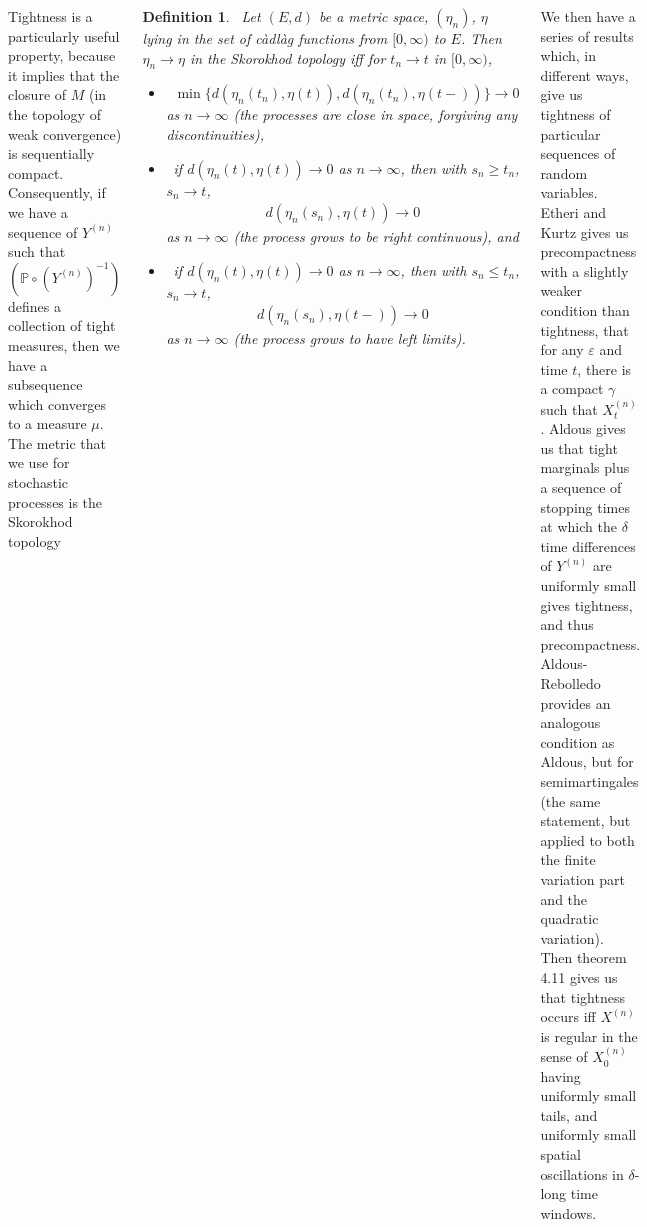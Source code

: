 \documentclass{tikzposter} %
\newcommand\Pj{\mathbb{P}}
\newcommand\rightopen[2]{\ensuremath{[#1,#2)}}
\newtheorem{definition}{Definition}
\begin{document}
\begin{columns}
{    Tightness is a particularly useful property, because it implies that the closure of $M$ (in the topology of weak convergence) is sequentially compact. Consequently, if we have a sequence of $Y^{(n)}$ such that $(\Pj \circ (Y^{(n)})^{-1})$ defines a collection of tight measures, then we have a subsequence which converges to a measure $\mu$. \\

    The metric that we use for stochastic processes is the Skorokhod topology
    \begin{definition}
    \ Let $(E, d)$ be a metric space, $(\eta_n)$, $\eta$ lying in the set of c\`adl\`ag functions from $\rightopen{0}{\infty}$ to $E$. Then $\eta_n \to \eta$ in the Skorokhod topology iff for $t_n \to t$ in $\rightopen{0}{\infty}$,
    \begin{itemize}[label=$\cdot$]
    \item \ $\min \{d(\eta_n(t_n), \eta(t)), d(\eta_n(t_n), \eta(t-))\} \to 0$ as $n \to \infty$ (the processes are close in space, forgiving any discontinuities),
    \item \ if $d(\eta_n(t), \eta(t)) \to 0$ as $n \to \infty$, then with $s_n \ge t_n$, $s_n \to t$,
    \begin{align*}
    d(\eta_n(s_n), \eta(t)) \to 0
    \end{align*}
    as $n \to \infty$ (the process grows to be right continuous), and
    \item \ if $d(\eta_n(t), \eta(t)) \to 0$ as $n \to \infty$, then with $s_n \le t_n$, $s_n \to t$,
    \begin{align*}
    d(\eta_n(s_n), \eta(t-)) \to 0
    \end{align*}
    as $n \to \infty$ (the process grows to have left limits).
    \end{itemize}
    \end{definition}
    \hphantom{}

    We then have a series of results which, in different ways, give us tightness of particular sequences of random variables. \\

    Etheri and Kurtz gives us precompactness with a slightly weaker condition than tightness, that for any $\varepsilon$ and time $t$, there is a compact $\gamma$ such that $X^{(n)}_t$. Aldous gives us that tight marginals plus a sequence of stopping times at which the $\delta$ time differences of $Y^{(n)}$ are uniformly small gives tightness, and thus precompactness. Aldous-Rebolledo provides an analogous condition as Aldous, but for semimartingales (the same statement, but applied to both the finite variation part and the quadratic variation). Then theorem 4.11 gives us that tightness occurs iff $X^{(n)}$ is regular in the sense of $X_0^{(n)}$ having uniformly small tails, and uniformly small spatial oscillations in $\delta$-long time windows. \\

}
\end{columns}
\end{document}
